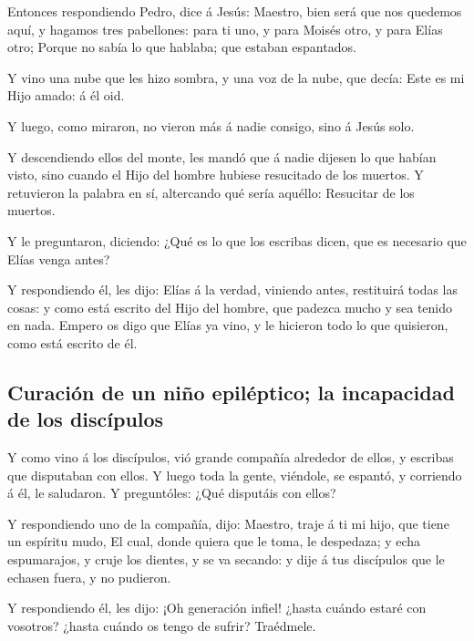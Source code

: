  Entonces respondiendo Pedro, dice á Jesús: Maestro, bien
será que nos quedemos aquí, y hagamos tres pabellones: para ti uno, y
para Moisés otro, y para Elías otro;  Porque no sabía lo
que hablaba; que estaban espantados.

 Y vino una nube que les hizo sombra, y una voz de la
nube, que decía: Este es mi Hijo amado: á él oid.

 Y luego, como miraron, no vieron más á nadie consigo,
sino á Jesús solo.

 Y descendiendo ellos del monte, les mandó que á nadie
dijesen lo que habían visto, sino cuando el Hijo del hombre hubiese
resucitado de los muertos.  Y retuvieron la palabra en
sí, altercando qué sería aquéllo: Resucitar de los muertos.

 Y le preguntaron, diciendo: ¿Qué es lo que los escribas
dicen, que es necesario que Elías venga antes?

 Y respondiendo él, les dijo: Elías á la verdad, viniendo
antes, restituirá todas las cosas: y como está escrito del Hijo del
hombre, que padezca mucho y sea tenido en nada.  Empero
os digo que Elías ya vino, y le hicieron todo lo que quisieron, como
está escrito de él.

\hypertarget{curaciuxf3n-de-un-niuxf1o-epiluxe9ptico-la-incapacidad-de-los-discuxedpulos}{%
\subsection{Curación de un niño epiléptico; la incapacidad de los
discípulos}\label{curaciuxf3n-de-un-niuxf1o-epiluxe9ptico-la-incapacidad-de-los-discuxedpulos}}

 Y como vino á los discípulos, vió grande compañía
alrededor de ellos, y escribas que disputaban con ellos. 
Y luego toda la gente, viéndole, se espantó, y corriendo á él, le
saludaron.  Y preguntóles: ¿Qué disputáis con ellos?

 Y respondiendo uno de la compañía, dijo: Maestro, traje
á ti mi hijo, que tiene un espíritu mudo,  El cual, donde
quiera que le toma, le despedaza; y echa espumarajos, y cruje los
dientes, y se va secando: y dije á tus discípulos que le echasen fuera,
y no pudieron.

 Y respondiendo él, les dijo: ¡Oh generación infiel!
¿hasta cuándo estaré con vosotros? ¿hasta cuándo os tengo de sufrir?
Traédmele.

